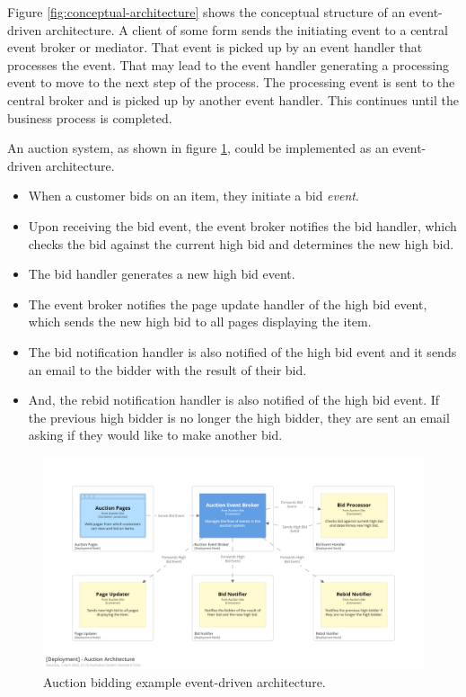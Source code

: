 Figure \ref{fig:conceptual-architecture} shows the conceptual structure of an event-driven architecture.
A client of some form sends the initiating event to a central event broker or mediator.
That event is picked up by an event handler that processes the event.
That may lead to the event handler generating a processing event to move to the next step of the process.
The processing event is sent to the central broker and is picked up by another event handler.
This continues until the business process is completed.

An auction system, as shown in figure \ref{fig:auction-architecture}, could be implemented as an event-driven architecture.
\begin{itemize}[nosep]
    \item When a customer bids on an item, they initiate a bid \emph{event}.
    \item Upon receiving the bid event, the event broker notifies the bid handler, which checks the bid against the current high bid and determines the new high bid.
    \item The bid handler generates a new high bid event.
    \item The event broker notifies the page update handler of the high bid event, which sends the new high bid to all pages displaying the item.
    \item The bid notification handler is also notified of the high bid event and it sends an email to the bidder with the result of their bid.
    \item And, the rebid notification handler is also notified of the high bid event.
             If the previous high bidder is no longer the high bidder, they are sent an email asking if they would like to make another bid.
\end{itemize}

\begin{figure}[h!]
    \begin{adjustwidth}{-10mm}{-10mm}
        \centering
        \includegraphics[trim=195 195 195 195,clip,width=0.95\paperwidth]{diagrams/auction-architecture.png}
    \end{adjustwidth}
    \caption{Auction bidding example event-driven architecture.}
    \label{fig:auction-architecture}
\end{figure}

